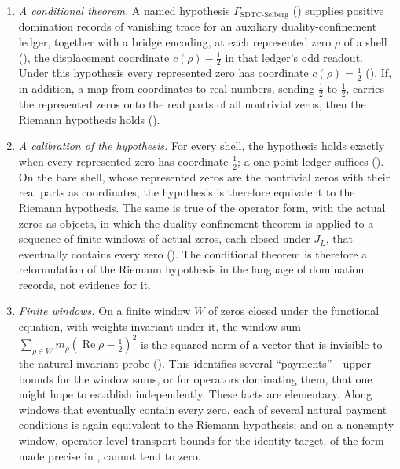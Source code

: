 \documentclass[11pt]{article}
\DeclareMathOperator{\Real}{Re}
\newcommand{\JL}{J_{L}}
\newcommand{\GamSDTCSelberg}{\Gamma_{\mathrm{SDTC\text{-}Selberg}}}
\theoremstyle{definition}
\begin{document}
\begin{enumerate}
  \item \emph{A conditional theorem.}  A named hypothesis
    \(\GamSDTCSelberg\) () supplies
    positive domination records of vanishing trace for an auxiliary
    duality-confinement ledger, together with a bridge encoding, at each represented zero \(\rho\) of a
    shell (), the displacement coordinate
    \(c(\rho)-\frac12\) in that ledger's odd readout.  Under
    this hypothesis every represented zero has coordinate
    \(c(\rho)=\frac12\) ().  If,
    in addition, a map from coordinates to real numbers, sending
    \(\frac12\) to \(\frac12\), carries the represented zeros onto the
    real parts of all nontrivial zeros, then the Riemann hypothesis
    holds ().
  \item \emph{A calibration of the hypothesis.}  For every shell, the hypothesis holds exactly when every represented zero
    has coordinate \(\frac12\); a one-point ledger suffices
    ().  On the bare shell, whose
    represented zeros are the nontrivial zeros with their real parts as
    coordinates, the hypothesis is therefore equivalent to the Riemann
    hypothesis.  The same is true of the operator form, with the actual zeros as
    objects, in which the duality-confinement theorem is applied to a
    sequence of finite windows of actual zeros,
    each closed under \(\JL\), that eventually contains every zero
    ().  The conditional theorem
    is therefore a reformulation of the Riemann hypothesis in the
    language of domination records, not evidence for it.
  \item \emph{Finite windows.}  On a finite window \(W\) of zeros
    closed under the functional equation, with weights invariant under
    it, the window sum \(\sum_{\rho\in W}m_\rho(\Real\rho-\frac12)^2\)
    is the squared norm of a vector that is invisible to the natural
    invariant probe ().  This identifies several ``payments''---upper bounds for the window
    sums, or for operators dominating them, that one might hope to
    establish independently.
    These facts are elementary.  Along windows that eventually contain
    every zero, each of several natural payment conditions is again
    equivalent to the Riemann hypothesis; and on a nonempty window, operator-level transport bounds for the
    identity target, of the form made precise in
    , cannot tend to zero.
\end{enumerate}
\end{document}
